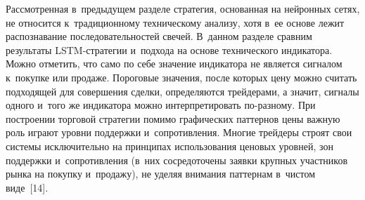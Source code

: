 {\begin{multicols}{2}
  Рассмотренная в~предыдущем разделе стратегия, основанная на нейронных сетях, не 
относится к~традиционному техническому анализу, хотя в~ее основе лежит распознавание 
последовательностей свечей. В~данном разделе сравним результаты LSTM-стра\-те\-гии 
и~подхода на основе технического индикатора. Можно отметить, что само по себе значение 
индикатора не является сигналом к~покупке или продаже. Пороговые значения, после 
которых цену можно считать подходящей для совершения сделки, определяются 
трейдерами, а значит, сигналы одного и~того же индикатора можно интерпретировать по-раз\-но\-му. 
При построении торговой стратегии помимо графических паттернов цены важ\-ную 
роль играют уровни поддержки и~сопротивления. Многие трейдеры строят свои сис\-те\-мы 
исключительно на принципах использования ценовых уровней, зон поддержки 
и~сопротивления (в~них сосредоточены заявки крупных участников рынка на покупку 
и~продажу), не уделяя внимания паттернам в~чистом виде~[14].
  

\end{multicols}}
